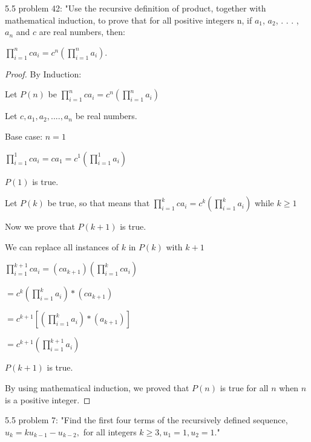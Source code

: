 \documentclass{article}
\begin{document}
\clearpage
\header

\item 5.5 problem 42: "Use the recursive definition of product, together with mathematical induction, to prove that for all positive integers n, if $a_1$, $a_2$, . . . , $a_n$ and $c$ are real numbers, then:

\item ${\displaystyle \prod_{i=1}^{n} ca_i} = c^{n} ({\displaystyle \prod_{i=1}^{n} a_i})$.

\begin{proof}
    \caption{By Induction:} Let $P(n)$ be ${\displaystyle \prod_{i=1}^{n} ca_i} = c^{n} ({\displaystyle \prod_{i=1}^{n} a_i})$

Let $c, a_1, a_2, ...., a_n$ be real numbers. 

Base case: $n = 1$

${\displaystyle \prod_{i=1}^{1} ca_i} = ca_1 = c^{1} ({\displaystyle \prod_{i=1}^{1} a_i})$

$P(1)$ is true.

Let $P(k)$ be true, so that means that ${\displaystyle \prod_{i=1}^{k} ca_i} = c^{k} ({\displaystyle \prod_{i=1}^{k} a_i})$  while $k \geq 1$

Now we prove that $P(k + 1)$ is true.

We can replace all instances of $k$ in $P(k)$ with $k+1$

${\displaystyle \prod_{i=1}^{k+1} ca_i} = (ca_{k+1}) ({\displaystyle \prod_{i=1}^{k} ca_i})$

$= c^{k} ({\displaystyle \prod_{i=1}^{k} a_i}) * (ca_{k+1})$

$= c^{k+1} [({\displaystyle \prod_{i=1}^{k} a_i}) * (a_{k+1})]$

$= c^{k+1} ({\displaystyle \prod_{i=1}^{k+1} a_i})$

$P(k+1)$ is true.

By using mathematical induction, we proved that $P(n)$ is true for all $n$ when $n$ is a positive integer.
\end{proof}



\clearpage
\header

\item 5.5 problem 7: "Find the first four terms of  the recursively defined sequence, $u_k = ku_{k-1} - u_{k-2},$ for all integers $k \geq 3, u_1 = 1, u_2 = 1$."
\end{document}
